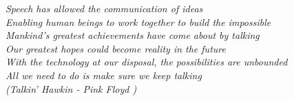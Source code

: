 \begin{epigrafe}
\vspace*{\fill}
\begin{flushright}{}



\textit{Speech has allowed the communication of ideas\\
Enabling human beings to work together to build the impossible\\
Mankind's greatest achievements have come about by talking\\
Our greatest hopes could become reality in the future\\
With the technology at our disposal, the possibilities are unbounded\\
All we need to do is make sure we keep talking\\ (\small{Talkin' Hawkin - Pink Floyd })}



\end{flushright}
\end{epigrafe}
